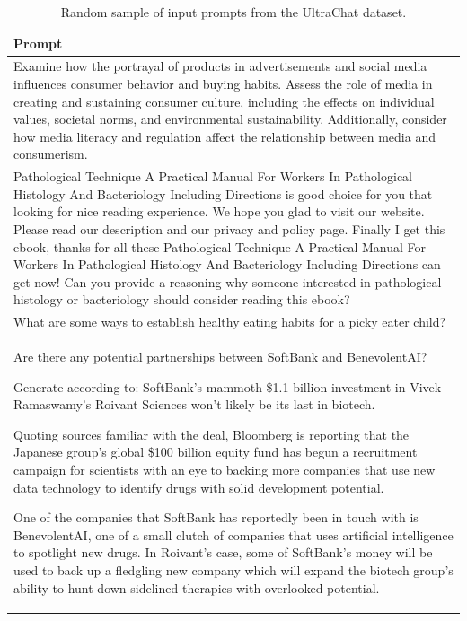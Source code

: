 \documentclass{article}
\theoremstyle{plain}
\theoremstyle{definition}
\theoremstyle{remark}
\begin{document}
\begin{table}[ht]
\caption{Random sample of input prompts from the UltraChat dataset.}
\label{tab:ultrachat_examples}
\vskip 0.15in
\begin{center}
\begin{small}
\begin{tabular}{p{1.0\linewidth}}
\toprule
\textbf{Prompt} \\
\midrule
Examine how the portrayal of products in advertisements and social media influences consumer behavior and buying habits. Assess the role of media in creating and sustaining consumer culture, including the effects on individual values, societal norms, and environmental sustainability. Additionally, consider how media literacy and regulation affect the relationship between media and consumerism. \\
\midrule
Pathological Technique A Practical Manual For Workers In Pathological Histology And Bacteriology Including Directions is good choice for you that looking for nice reading experience. We hope you glad to visit our website. Please read our description and our privacy and policy page. Finally I get this ebook, thanks for all these Pathological Technique A Practical Manual For Workers In Pathological Histology And Bacteriology Including Directions can get now! Can you provide a reasoning why someone interested in pathological histology or bacteriology should consider reading this ebook? \\
\midrule
What are some ways to establish healthy eating habits for a picky eater child? \\
\midrule
Are there any potential partnerships between SoftBank and BenevolentAI?

Generate according to: SoftBank’s mammoth \$1.1 billion investment in Vivek Ramaswamy’s Roivant Sciences won’t likely be its last in biotech.

Quoting sources familiar with the deal, Bloomberg is reporting that the Japanese group’s global \$100 billion equity fund has begun a recruitment campaign for scientists with an eye to backing more companies that use new data technology to identify drugs with solid development potential.

One of the companies that SoftBank has reportedly been in touch with is BenevolentAI, one of a small clutch of companies that uses artificial intelligence to spotlight new drugs. In Roivant’s case, some of SoftBank’s money will be used to back up a fledgling new company which will expand the biotech group’s ability to hunt down sidelined therapies with overlooked potential.


\end{tabular}
\end{small}
\end{center}
\end{table}
\end{document}
